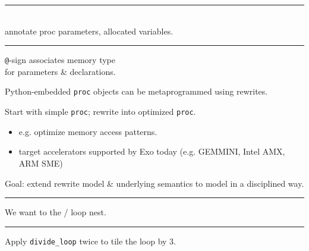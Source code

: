 \newpage
{}

{\large

}

\vspace{3mm}
\hrule

{\LARGE
{}\\
annotate proc parameters, allocated variables.

}

\newpage
{}

{\large

}

\vspace{3mm}
\hrule

{\LARGE
{} \texttt{@}-sign associates memory type\\
for parameters \& declarations.
}

\newpage
{}

{\LARGE
{} Python-embedded \texttt{proc} objects can be metaprogrammed using  rewrites.

Start with simple \texttt{proc}; rewrite into optimized \texttt{proc}.
\begin{itemize}
  \item e.g. optimize memory access patterns.
  \item target  accelerators supported by Exo today (e.g. GEMMINI, Intel AMX, ARM SME)
\end{itemize}

Goal: extend rewrite model \& underlying semantics to model  in a disciplined way.

}

\newpage
{}

{\large

}

\vspace{3mm}
\hrule

{\LARGE
We want to  the / loop nest.

}


\newpage
{}

{\large

}

\vspace{3mm}
\hrule

{\LARGE
Apply \texttt{divide\_loop} twice to tile the  loop by 3.

}

